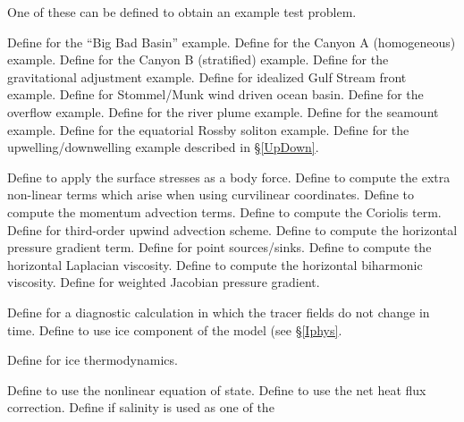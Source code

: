 \begin{klist}
    One of these can be defined to obtain
an example test problem.
  \begin{klist}
          Define for the ``Big Bad Basin'' example.
      Define for the Canyon A (homogeneous) example.
      Define for the Canyon B (stratified) example.
      Define for the gravitational adjustment example.
      Define for idealized Gulf Stream front example.
           Define for Stommel/Munk wind driven ocean basin.
       Define for the overflow example.
     Define for the river plume example.
       Define for the seamount example.
        Define for the equatorial Rossby soliton example.
      Define for the upwelling/downwelling
  example described in \S\ref{UpDown}.
  \end{klist}
    \mbox{}
  \begin{klist}
       Define to apply the surface
  stresses as a body force.
        Define to compute the extra
  non-linear terms which arise when using curvilinear coordinates.
         Define to compute the momentum advection terms.
         Define to compute the Coriolis term.
     Define for third-order upwind advection scheme.
         Define to compute the
  horizontal pressure gradient term.
     Define for point sources/sinks.
        Define to compute the
  horizontal Laplacian viscosity.
        Define to compute the
  horizontal biharmonic viscosity.
         Define for weighted Jacobian pressure gradient.
  \end{klist}
   \mbox{}
  \begin{klist}
      Define for a diagnostic
  calculation in which the tracer fields do not change in time.
     Define to use ice component of the model (see
       \S\ref{Iphys}.
      \begin{klist}
         Define for ice thermodynamics.
      \end{klist}
     Define to use the nonlinear
  equation of state.
      Define to use the net heat
  flux correction.
          Define if salinity is used as one of the

\end{klist}
\end{klist}
